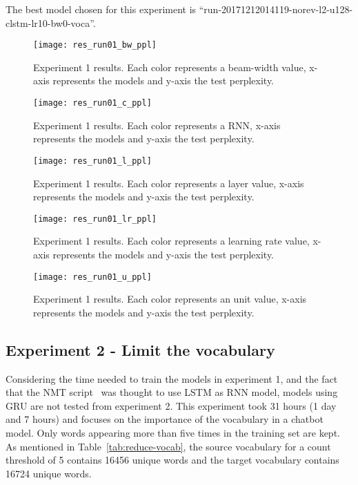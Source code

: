 The best model chosen for this experiment is ``run-20171212014119-norev-l2-u128-clstm-lr10-bw0-voca''.

\begin{landscape}
\begin{figure}
    \centering
    \texttt{[image: res\_run01\_bw\_ppl]}
    \decoRule
    \caption[Results experiment 1 BW-PPL]{Experiment 1 results. Each color represents a beam-width value, x-axis represents the models and y-axis the test perplexity.}
    \label{fig:res_run01_bw_ppl}
\end{figure}
\begin{figure}
    \centering
    \texttt{[image: res\_run01\_c\_ppl]}
    \decoRule
    \caption[Results experiment 1 C-PPL]{Experiment 1 results. Each color represents a RNN, x-axis represents the models and y-axis the test perplexity.}
    \label{fig:res_run01_c_ppl}
\end{figure}
\begin{figure}
    \centering
    \texttt{[image: res\_run01\_l\_ppl]}
    \decoRule
    \caption[Results experiment 1 L-PPL]{Experiment 1 results. Each color represents a layer value, x-axis represents the models and y-axis the test perplexity.}
    \label{fig:res_run01_l_ppl}
\end{figure}
\begin{figure}
    \centering
    \texttt{[image: res\_run01\_lr\_ppl]}
    \decoRule
    \caption[Results experiment 1 LR-PPL]{Experiment 1 results. Each color represents a learning rate value, x-axis represents the models and y-axis the test perplexity.}
    \label{fig:res_run01_lr_ppl}
\end{figure}
\begin{figure}
    \centering
    \texttt{[image: res\_run01\_u\_ppl]}
    \decoRule
    \caption[Results experiment 1 U-PPL]{Experiment 1 results. Each color represents an unit value, x-axis represents the models and y-axis the test perplexity.}
    \label{fig:res_run01_u_ppl}
\end{figure}
\end{landscape}

\subsection{Experiment 2 - Limit the vocabulary}
Considering the time needed to train the models in experiment 1, and the fact that the NMT script~\citep{tensorflow.nmt} was thought to use LSTM as RNN model, models using GRU are not tested from experiment 2. This experiment took 31 hours (1 day and 7 hours) and focuses on the importance of the vocabulary in a chatbot model.
Only words appearing more than five times in the training set are kept. As mentioned in Table~\ref{tab:reduce-vocab}, the source vocabulary for a count threshold of 5 contains \num{16456} unique words and the target vocabulary contains \num{16724} unique words.

